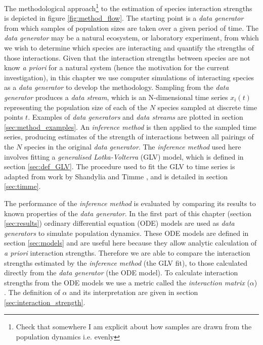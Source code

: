 The methodological approach\footnote{Check that somewhere I am explicit about how samples are drawn from the population dynamics i.e. evenly} to the estimation of species interaction strengths is depicted in figure \ref{fig:method_flow}. The starting point is a \emph{data generator} from which samples of population sizes are taken over a given period of time. The \emph{data generator} may be a natural ecosystem, or laboratory experiment, from which we wish to determine which species are interacting and quantify the strengths of those interactions. Given that the interaction strengths between species are not know \emph{a priori} for a natural system (hence the motivation for the current investigation), in this chapter we use computer simulations of interacting species as a \emph{data generator} to develop the methodology. Sampling from the \emph{data generator} produces a \emph{data stream}, which is an N-dimensional time series $x_i(t)$ representing the population size of each of the $N$ species sampled at discrete time points $t$. Examples of \emph{data generators} and \emph{data streams} are plotted in section \ref{sec:method_examples}. An \emph{inference method} is then applied to the sampled time series, producing estimates of the strength of interactions between all pairings of the $N$ species in the original \emph{data generator}. The \emph{inference method} used here involves fitting a \emph{generalised Lotka-Volterra} (GLV) model, which is defined in section \ref{sec:def_GLV}. The procedure used to fit the GLV to time series is adapted from work by Shandylia and Timme \cite{shandilya2011inferring}, and is detailed in section \ref{sec:timme}.

The performance of the \emph{inference method} is evaluated by comparing its results to known properties of the \emph{data generator}. In the first part of this chapter (section \ref{sec:results}) ordinary differential equation (ODE) models are used as \emph{data generators} to simulate population dynamics. These ODE models are defined in section \ref{sec:models} and are useful here because they allow analytic calculation of \emph{a priori} interaction strengths. Therefore we are able to compare the interaction strengths estimated by the \emph{inference method} (the GLV fit), to those calculated directly from the \emph{data generator} (the ODE model). To calculate interaction strengths from the ODE models we use a metric called the \emph{interaction matrix} ($\alpha$) \cite{berlow2004interaction}. The definition of $\alpha$ and its interpretation are given in section \ref{sec:interaction_strength}.

